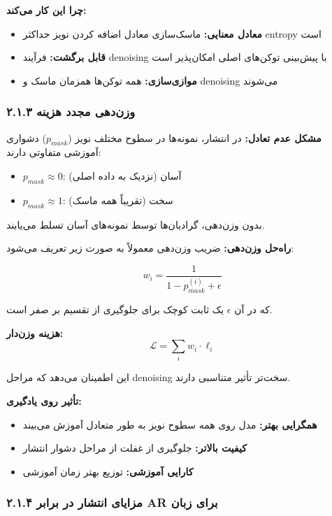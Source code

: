 \documentclass[12pt,a4paper]{article}
\theoremstyle{definition}
\begin{document}
\textbf{چرا این کار می‌کند:}
\begin{itemize}
    \item \textbf{معادل معنایی:} ماسک‌سازی معادل اضافه کردن نویز حداکثر entropy است
    \item \textbf{قابل برگشت:} فرآیند denoising با پیش‌بینی توکن‌های اصلی امکان‌پذیر است
    \item \textbf{موازی‌سازی:} همه توکن‌ها همزمان ماسک و denoising می‌شوند
\end{itemize}

\subsubsection*{۲.۱.۳ وزن‌دهی مجدد هزینه}

\textbf{مشکل عدم تعادل:}
در انتشار، نمونه‌ها در سطوح مختلف نویز ($p_{mask}$) دشواری آموزشی متفاوتی دارند:
\begin{itemize}
    \item $p_{mask} \approx 0$: آسان (نزدیک به داده اصلی)
    \item $p_{mask} \approx 1$: سخت (تقریباً همه ماسک)
\end{itemize}

بدون وزن‌دهی، گرادیان‌ها توسط نمونه‌های آسان تسلط می‌یابند.

\textbf{راه‌حل وزن‌دهی:}
ضریب وزن‌دهی معمولاً به صورت زیر تعریف می‌شود:

\begin{equation}
w_i = \frac{1}{1 - p_{mask}^{(i)} + \epsilon}
\end{equation}

که در آن $\epsilon$ یک ثابت کوچک برای جلوگیری از تقسیم بر صفر است.

\textbf{هزینه وزن‌دار:}
\begin{equation}
\mathcal{L} = \sum_{i} w_i \cdot \ell_i
\end{equation}

این اطمینان می‌دهد که مراحل denoising سخت‌تر تأثیر متناسبی دارند.

\textbf{تأثیر روی یادگیری:}
\begin{itemize}
    \item \textbf{همگرایی بهتر:} مدل روی همه سطوح نویز به طور متعادل آموزش می‌بیند
    \item \textbf{کیفیت بالاتر:} جلوگیری از غفلت از مراحل دشوار انتشار
    \item \textbf{کارایی آموزشی:} توزیع بهتر زمان آموزشی
\end{itemize}

\subsubsection*{۲.۱.۴ مزایای انتشار در برابر AR برای زبان}
\end{document}
